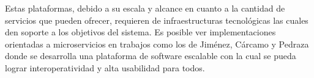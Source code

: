 Estas plataformas, debido a su escala y alcance en cuanto a la cantidad de servicios que pueden ofrecer, requieren de 
infraestructuras tecnológicas las cuales den soporte a los objetivos del sistema. Es posible ver implementaciones orientadas a microservicios en trabajos como los de Jiménez, Cárcamo y Pedraza \citeyear{henry_2020} donde se desarrolla una plataforma de software escalable con la cual se pueda lograr interoperatividad y alta usabilidad para todos.